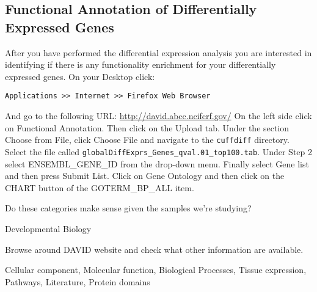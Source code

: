 \begin{bonus}
\section{Functional Annotation of Differentially Expressed Genes}
After you have performed the differential expression analysis you are interested
in identifying if there is any functionality enrichment for your differentially
expressed genes.
On your Desktop click:
\begin{lstlisting}[style=command_syntax]
Applications >> Internet >> Firefox Web Browser
\end{lstlisting}
And go to the following URL: \url{http://david.abcc.ncifcrf.gov/}
On the left side click on Functional Annotation. Then click on the Upload tab.
Under the section Choose from File, click Choose File and navigate to the
\texttt{cuffdiff} directory. Select the file called \texttt{globalDiffExprs\_Genes\_qval.01\_top100.tab}.
Under Step 2 select ENSEMBL\_GENE\_ID from the drop-down menu. Finally select
Gene list and then press Submit List.
Click on Gene Ontology and then click on the CHART button of the GOTERM\_BP\_ALL item.

\begin{questions}
Do these categories make sense given the samples we're studying?
\begin{answer}
Developmental Biology
\end{answer}

Browse around DAVID website and check what other information are available.
\begin{answer}
Cellular component, Molecular function, Biological Processes, Tissue expression, Pathways, Literature, Protein domains 
\end{answer}
\end{questions}
\end{bonus}

\newpage


